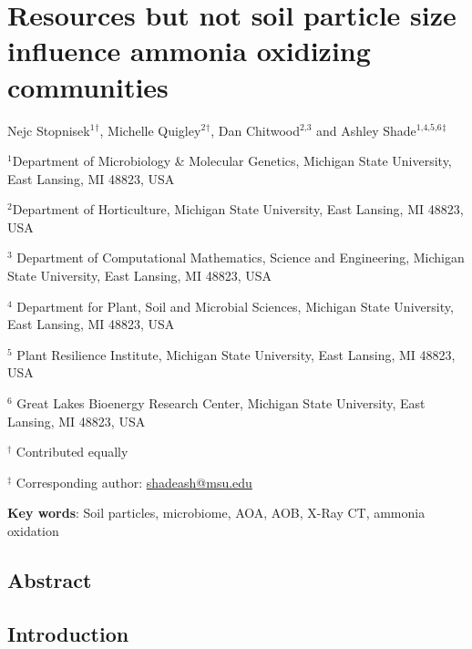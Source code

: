 \documentclass[
]{article}
\author{}
\date{\vspace{-2.5em}}
\begin{document}
\hypertarget{resources-but-not-soil-particle-size-influence-ammonia-oxidizing-communities}{%
\section{Resources but not soil particle size influence ammonia
oxidizing
communities}\label{resources-but-not-soil-particle-size-influence-ammonia-oxidizing-communities}}

\vspace{10mm}

Nejc Stopnisek\({^\text{1}}\)\({^\dagger}\), Michelle
Quigley\({^\text{2}}\)\({^\dagger}\), Dan Chitwood\({^\text{2,3}}\) and
Ashley Shade\({^\text{1,4,5,6}}\)\({^\ddagger}\)

\vspace{20mm}

\({^\text{1}}\)Department of Microbiology \& Molecular Genetics,
Michigan State University, East Lansing, MI 48823, USA

\({^\text{2}}\)Department of Horticulture, Michigan State University,
East Lansing, MI 48823, USA

\({^\text{3}}\) Department of Computational Mathematics, Science and
Engineering, Michigan State University, East Lansing, MI 48823, USA

\({^\text{4}}\) Department for Plant, Soil and Microbial Sciences,
Michigan State University, East Lansing, MI 48823, USA

\({^\text{5}}\) Plant Resilience Institute, Michigan State University,
East Lansing, MI 48823, USA

\({^\text{6}}\) Great Lakes Bioenergy Research Center, Michigan State
University, East Lansing, MI 48823, USA

\({^\dagger}\) Contributed equally

\({^\ddagger}\) Corresponding author:
\href{mailto:shadeash@msu.edu}{shadeash@msu.edu}

\vspace{40mm}

\textbf{Key words}: Soil particles, microbiome, AOA, AOB, X-Ray CT,
ammonia oxidation

\newpage

\hypertarget{abstract}{%
\subsection{Abstract}\label{abstract}}

\newpage

\hypertarget{introduction}{%
\subsection{Introduction}\label{introduction}}
\end{document}
